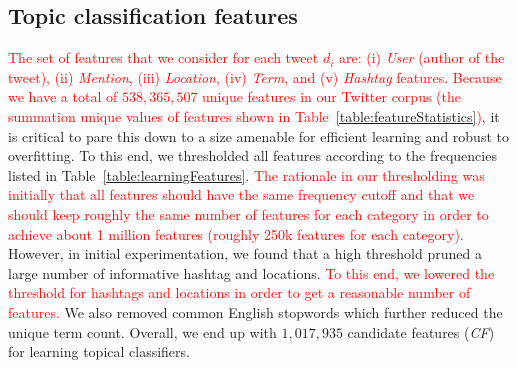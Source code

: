 
 

\subsection*{Topic classification features}

\textcolor{red}{The set of features that we consider for each tweet $d_i$ are: (i) \textit{User} (author of the tweet), (ii) \textit{Mention}, (iii) \textit{Location}, (iv) \textit{Term}, and (v) \textit{Hashtag} features.}
%
\textcolor{red}{Because we have a total of $538,365,507$ unique features in our
Twitter corpus (the summation unique values of features shown in Table~\ref{table:featureStatistics})}, it is critical to pare this down to a size amenable
for efficient learning and robust to overfitting.  To this end, we
thresholded all features according to the frequencies listed in
Table~\ref{table:learningFeatures}.  
\textcolor{red}{The rationale in our thresholding was initially that all features should have the same frequency cutoff and that we should keep roughly the same number of features for each category in order to achieve about 1 million features (roughly 250k features for each category).}  However, in  initial experimentation, we found that a high threshold pruned a large number of informative hashtag and locations.  \textcolor{red}{To this end, we lowered the threshold for hashtags and locations in order to get a reasonable number of features.}  We also removed common English stopwords which further reduced the unique term count.  Overall, we end up with $1,017,935$ candidate features (\textit{CF}) for learning topical classifiers.

